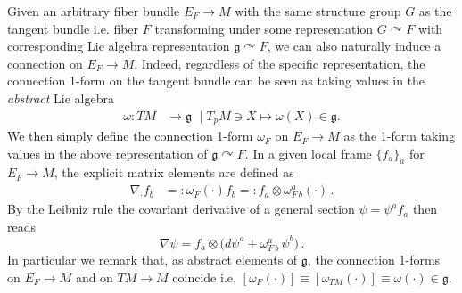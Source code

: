 \documentclass[../geometry_main.tex]{subfiles}
\begin{document}
\begin{mytheorem}
Given an arbitrary fiber bundle $E_F\to M$ with the same structure group $G$ as the tangent bundle i.e. fiber $F$ transforming under some representation $G\curvearrowright F$ with corresponding Lie algebra representation $\mathfrak{g}\curvearrowright F$, we can also naturally induce a connection on $E_F\to M$.
Indeed, regardless of the specific representation, the connection 1-form on the tangent bundle can be seen as taking values in the \emph{abstract} Lie algebra
\begin{align}
    \omega: TM &\to \mathfrak{g} \,\, \mid T_pM \ni X \mapsto \omega(X) \in \mathfrak{g}.
\end{align}
We then simply define the connection 1-form $\omega_{F}$ on $E_F\to M$ as the 1-form taking values in the above representation of $\mathfrak{g}\curvearrowright F$.
In a given local frame $\{f_a\}_a$ for $E_F\to M$, the explicit matrix elements are defined as
\begin{align}
    \nabla_\cdot f_b &=: \omega_{F}(\cdot) f_b =: f_a \otimes \omega^a_{F\, b}(\cdot)\,.
\end{align}
By the Leibniz rule the covariant derivative of a general section $\psi = \psi^a f_a$ then reads
\begin{equation}
    \nabla \psi = f_a \otimes \big(d\psi^a + \omega_{F\, b}^a \, \psi^b\big)\,.
\end{equation}
In particular we remark that, as abstract elements of $\mathfrak{g}$, the connection 1-forms on $E_F\to M$ and on $TM\to M$ coincide i.e. $[\omega_{F}(\cdot)]\equiv [ \omega_{TM}(\cdot)] \equiv \omega(\cdot)\in \mathfrak{g}$.
\end{mytheorem}
\end{document}
